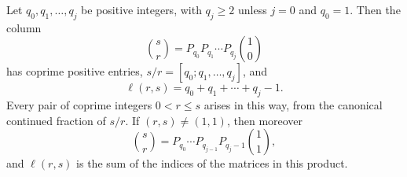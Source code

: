 \begin{lemma}\label{lem:cost-descriptions}
Let $q_0,q_1,\ldots,q_j$ be positive integers, with $q_j\geqslant2$ unless
$j=0$ and $q_0=1$. Then the column
\begin{equation}\label{eq:continued-fraction-product}
 \binom sr=P_{q_0}P_{q_1}\cdots P_{q_j}\binom10
\end{equation}
has coprime positive entries, $s/r=[q_0;q_1,\ldots,q_j]$, and
\begin{equation}\label{eq:quotient-cost}
 \ell(r,s)=q_0+q_1+\cdots+q_j-1 .
\end{equation}
Every pair of coprime integers $0<r\leqslant s$ arises in this way, from
the canonical continued fraction of $s/r$. If $(r,s)\neq(1,1)$, then
moreover
\begin{equation}\label{eq:index-product}
 \binom sr=P_{q_0}\cdots P_{q_{j-1}}P_{q_j-1}\binom11 ,
\end{equation}
and $\ell(r,s)$ is the sum of the indices of the matrices in this product.
\end{lemma}

